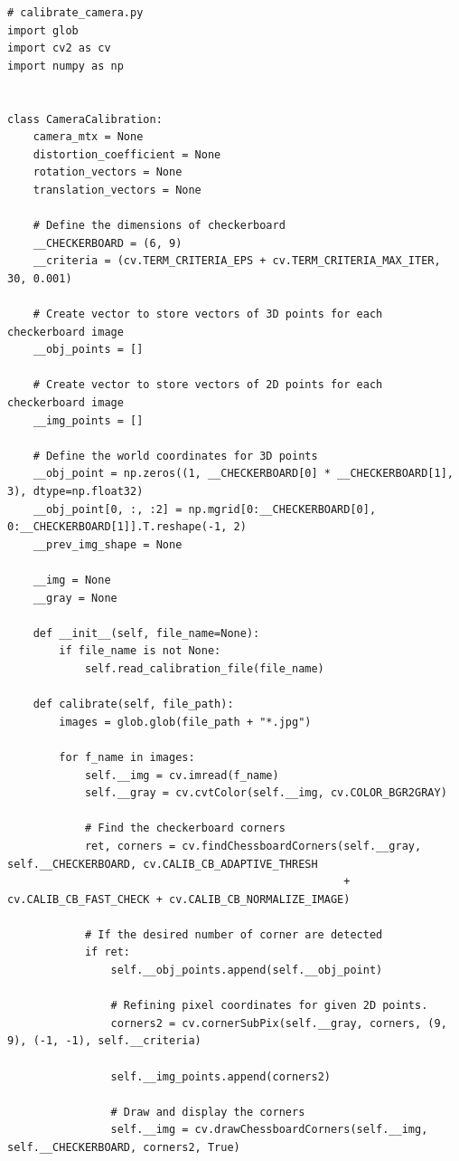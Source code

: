 \documentclass[a4paper, 12pt]{article}
\begin{document}
	\begin{lstlisting}
# calibrate_camera.py		
import glob
import cv2 as cv
import numpy as np


class CameraCalibration:
    camera_mtx = None
    distortion_coefficient = None
    rotation_vectors = None
    translation_vectors = None

    # Define the dimensions of checkerboard
    __CHECKERBOARD = (6, 9)
    __criteria = (cv.TERM_CRITERIA_EPS + cv.TERM_CRITERIA_MAX_ITER, 30, 0.001)

    # Create vector to store vectors of 3D points for each checkerboard image
    __obj_points = []

    # Create vector to store vectors of 2D points for each checkerboard image
    __img_points = []

    # Define the world coordinates for 3D points
    __obj_point = np.zeros((1, __CHECKERBOARD[0] * __CHECKERBOARD[1], 3), dtype=np.float32)
    __obj_point[0, :, :2] = np.mgrid[0:__CHECKERBOARD[0], 0:__CHECKERBOARD[1]].T.reshape(-1, 2)
    __prev_img_shape = None

    __img = None
    __gray = None

    def __init__(self, file_name=None):
        if file_name is not None:
            self.read_calibration_file(file_name)

    def calibrate(self, file_path):
        images = glob.glob(file_path + "*.jpg")

        for f_name in images:
            self.__img = cv.imread(f_name)
            self.__gray = cv.cvtColor(self.__img, cv.COLOR_BGR2GRAY)

            # Find the checkerboard corners
            ret, corners = cv.findChessboardCorners(self.__gray, self.__CHECKERBOARD, cv.CALIB_CB_ADAPTIVE_THRESH
                                                    + cv.CALIB_CB_FAST_CHECK + cv.CALIB_CB_NORMALIZE_IMAGE)

            # If the desired number of corner are detected
            if ret:
                self.__obj_points.append(self.__obj_point)

                # Refining pixel coordinates for given 2D points.
                corners2 = cv.cornerSubPix(self.__gray, corners, (9, 9), (-1, -1), self.__criteria)

                self.__img_points.append(corners2)

                # Draw and display the corners
                self.__img = cv.drawChessboardCorners(self.__img, self.__CHECKERBOARD, corners2, True)


\end{lstlisting}
\end{document}
